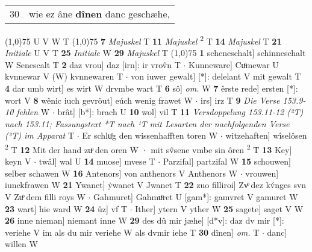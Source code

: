 \documentclass[8pt,a4paper,notitlepage]{article}
\begin{document}
\begin{table}[ht]
\begin{minipage}[t]{0.5\linewidth}
\begin{tabular}{rl}
30 & wie ez âne \textbf{dînen} danc geschæhe,\\ 
\end{tabular}
\scriptsize
\line(1,0){75} \newline
U V W T \newline
\line(1,0){75} \newline
\textbf{7} \textit{Majuskel} T  \textbf{11} \textit{Majuskel} \textsuperscript{2}\hspace{-1.3mm} T  \textbf{14} \textit{Majuskel} T  \textbf{21} \textit{Initiale} U V T  \textbf{25} \textit{Initiale} W  \textbf{29} \textit{Majuskel} T  \newline
\line(1,0){75} \newline
\textbf{1} scheneschalt] schinneschalt W Senescalt T \textbf{2} daz vrou] daz [irn]: ir vrov̂n T  $\cdot$ Kunneware] Cuͦmewar U kvnnewar V (W) kvnnewaren T  $\cdot$ von iuwer gewalt] [*]: delelant V mit gewalt T \textbf{4} dar umb wirt] es wirt W drvmbe wart T \textbf{6} sô] \textit{om.} W \textbf{7} êrste rede] ersten [*]: wort V \textbf{8} wênic iuch gevröut] eúch wenig frawet W  $\cdot$ irs] irz T \textbf{9} \textit{Die Verse 153.9-10 fehlen} W   $\cdot$ brât] [b*]: brach U \textbf{10} wol] vil T \textbf{11} \textit{Versdoppelung 153.11-12 (²T) nach 153.11; Fassungstext *T nach ¹T mit Lesarten der nachfolgenden Verse (²T) im Apparat} T   $\cdot$ Er schluͦg den wissenhafften toren W  $\cdot$ witzehaften] wîselôsen \textsuperscript{2}\hspace{-1.3mm} T \textbf{12} Mit der hand zuͦ den oren W · mit sv̂sene vmbe sin ôren \textsuperscript{2}\hspace{-1.3mm} T \textbf{13} Key] keyn V  $\cdot$ twâl] wal U \textbf{14} muose] mvese T  $\cdot$ Parzifal] partzifal W \textbf{15} schouwen] selber schawen W \textbf{16} Antenors] von anthenors V Anthenors W  $\cdot$ vrouwen] iunckfrawen W \textbf{21} Ywanet] ẏwanet V Jwanet T \textbf{22} zuo filliroi] Zvͦ dez kv́nges svn V Zuͦ dem filli roys W  $\cdot$ Gahmuret] Gahmuͦret U [gam*]: gamvret V gamuret W \textbf{23} wart] hie ward W \textbf{24} ûz] vf T  $\cdot$ Ither] ytern V yther W \textbf{25} sagete] saget V W \textbf{26} inne nieman] niemant inne W \textbf{29} des dû mir jæhe] [d*v]: daz dv mir [*]: veriehe V im als du mir veriehe W als dvmir iehe T \textbf{30} dînen] \textit{om.} T  $\cdot$ danc] willen W \newline
\end{minipage}
\end{table}
\end{document}
